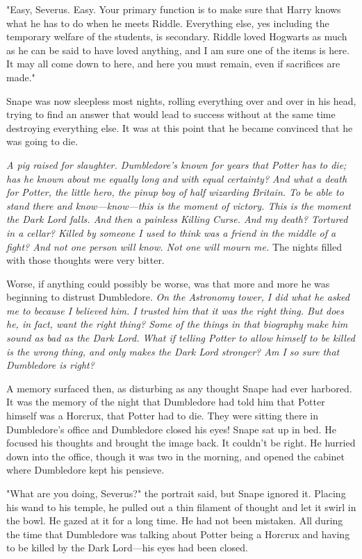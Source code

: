 "Easy, Severus. Easy. Your primary function is to make sure that Harry knows what he has to do when he meets Riddle. Everything else, yes including the temporary welfare of the students, is secondary. Riddle loved Hogwarts as much as he can be said to have loved anything, and I am sure one of the items is here. It may all come down to here, and here you must remain, even if sacrifices are made."

Snape was now sleepless most nights, rolling everything over and over in his head, trying to find an answer that would lead to success without at the same time destroying everything else. It was at this point that he became convinced that he was going to die.

\emph{A pig raised for slaughter. Dumbledore's known for years that Potter has to die; has he known about me equally long and with equal certainty? And what a death for Potter, the little hero, the pinup boy of half wizarding Britain. To be able to stand there and know—know—this is the moment of victory. This is the moment the Dark Lord falls. And then a painless Killing Curse. And my death? Tortured in a cellar? Killed by someone I used to think was a friend in the middle of a fight? And not one person will know. Not one will mourn me.} The nights filled with those thoughts were very bitter.

Worse, if anything could possibly be worse, was that more and more he was beginning to distrust Dumbledore. \emph{On the Astronomy tower, I did what he asked me to because I believed him. I trusted him that it was the right thing. But does he, in fact, want the right thing? Some of the things in that biography make him sound as bad as the Dark Lord. What if telling Potter to allow himself to be killed is the wrong thing, and only makes the Dark Lord stronger? Am I so sure that Dumbledore is right?}

A memory surfaced then, as disturbing as any thought Snape had ever harbored. It was the memory of the night that Dumbledore had told him that Potter himself was a Horcrux, that Potter had to die. They were sitting there in Dumbledore's office and{\el} Dumbledore closed his eyes! Snape sat up in bed. He focused his thoughts and brought the image back. It couldn't be right. He hurried down into the office, though it was two in the morning, and opened the cabinet where Dumbledore kept his pensieve.

"What are you doing, Severus?" the portrait said, but Snape ignored it. Placing his wand to his temple, he pulled out a thin filament of thought and let it swirl in the bowl. He gazed at it for a long time. He had not been mistaken. All during the time that Dumbledore was talking about Potter being a Horcrux and having to be killed by the Dark Lord—his eyes had been closed.

